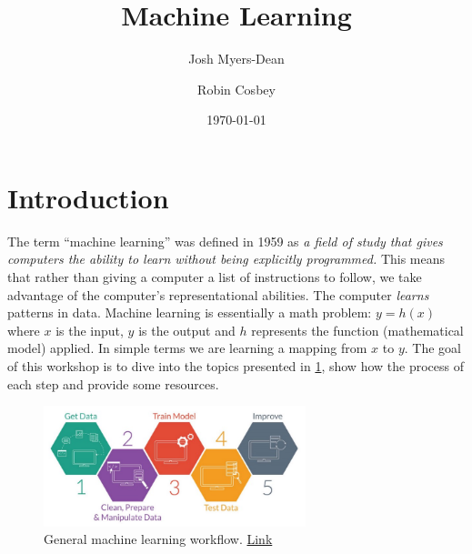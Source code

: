 \documentclass{article}
\title{Machine Learning}
\author{Josh Myers-Dean \and Robin Cosbey}
\date{\today}
\begin{document}
\maketitle
\newpage
\tableofcontents
\newpage

\section{Introduction} 
The term ``machine learning'' was defined in 1959 as \textit{a field of study that gives computers the ability to learn without being explicitly programmed.} This means that rather than giving a computer a list of instructions to follow, we take advantage of the computer's representational abilities. The computer \textit{learns} patterns in data. Machine learning is essentially a math problem: $y = h(x)$ where $x$ is the input, $y$ is the output and $h$ represents the function (mathematical model) applied. In simple terms we are learning a mapping from $x$ to $y$. The goal of this workshop is to dive into the topics presented in \ref{fig:flow}, show how the process of each step and provide some resources.

\begin{figure}[H]
    \centering
    \includegraphics[width=3in]{flowchart.jpeg}
    \caption{General machine learning workflow. \href{https://www.freecodecamp.org/news/every-single-machine-learning-course-on-the-internet-ranked-by-your-reviews-3c4a7b8026c0/}{Link}}
    \label{fig:flow}
\end{figure}
\end{document}
